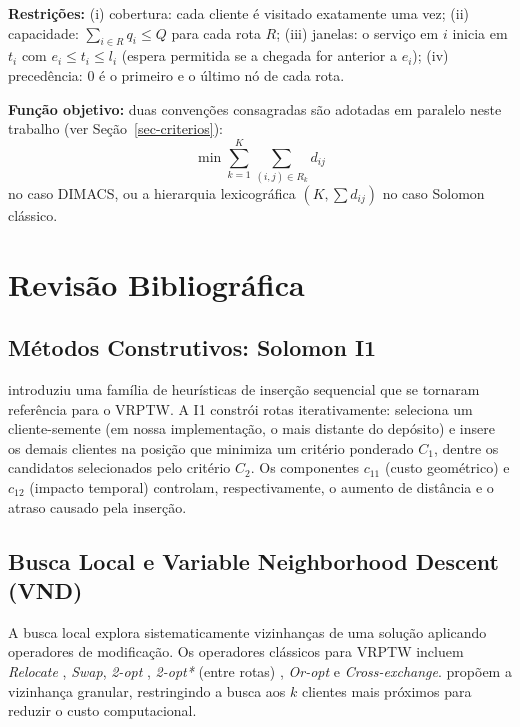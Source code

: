 \documentclass[10pt, a4paper]{article}
\begin{document}
\textbf{Restri\c{c}\~oes:} (i) cobertura: cada cliente \'e visitado exatamente uma vez; (ii) capacidade: $\sum_{i \in R} q_i \leq Q$ para cada rota $R$; (iii) janelas: o servi\c{c}o em $i$ inicia em $t_i$ com $e_i \leq t_i \leq l_i$ (espera permitida se a chegada for anterior a $e_i$); (iv) preced\^encia: $0$ \'e o primeiro e o \'ultimo n\'o de cada rota.

\textbf{Fun\c{c}\~ao objetivo:} duas conven\c{c}\~oes consagradas s\~ao adotadas em paralelo neste trabalho (ver Se\c{c}\~ao~\ref{sec-criterios}):
\begin{equation}
    \min \sum_{k=1}^{K} \sum_{(i,j) \in R_k} d_{ij}
    \label{eq:objective}
\end{equation}
no caso DIMACS, ou a hierarquia lexicogr\'afica $(K, \sum d_{ij})$ no caso Solomon cl\'assico.

\section{Revis\~ao Bibliogr\'afica}
\label{sec-revisao}

\subsection{M\'etodos Construtivos: Solomon I1}

\citet{solomon1987} introduziu uma fam\'ilia de heur\'isticas de inser\c{c}\~ao sequencial que se tornaram refer\^encia para o VRPTW. A I1 constr\'oi rotas iterativamente: seleciona um cliente-semente (em nossa implementa\c{c}\~ao, o mais distante do dep\'osito) e insere os demais clientes na posi\c{c}\~ao que minimiza um crit\'erio ponderado $C_1$, dentre os candidatos selecionados pelo crit\'erio $C_2$. Os componentes $c_{11}$ (custo geom\'etrico) e $c_{12}$ (impacto temporal) controlam, respectivamente, o aumento de dist\^ancia e o atraso causado pela inser\c{c}\~ao.

\subsection{Busca Local e Variable Neighborhood Descent (VND)}

A busca local explora sistematicamente vizinhan\c{c}as de uma solu\c{c}\~ao aplicando operadores de modifica\c{c}\~ao. Os operadores cl\'assicos para VRPTW \citep{braysy2005, toth2003} incluem \textit{Relocate} \citep{shaw1998}, \textit{Swap}, \textit{2-opt} \citep{lin1973}, \textit{2-opt*} (entre rotas) \citep{potvin1995}, \textit{Or-opt} \citep{or1976} e \textit{Cross-exchange}. \citet{toth2003} prop\~oem a vizinhan\c{c}a granular, restringindo a busca aos $k$ clientes mais pr\'oximos para reduzir o custo computacional.
\end{document}
